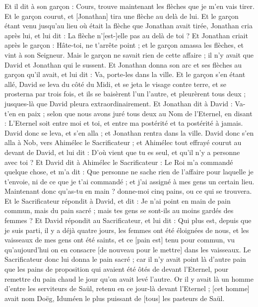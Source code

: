 \begin{multicols}{2}
Et il dit à son garçon : Cours, trouve maintenant les flèches que je m'en vais tirer. Et le garçon courut, et [Jonathan] tira une flèche au delà de lui.
Et le garçon étant venu jusqu'au lieu où était la flèche que Jonathan avait tirée, Jonathan cria après lui, et lui dit : La flèche n'[est-]elle pas au delà de toi ?
Et Jonathan criait après le garçon : Hâte-toi, ne t'arrête point ; et le garçon amassa les flèches, et vint à son Seigneur.
Mais le garçon ne savait rien de cette affaire ; il n'y avait que David et Jonathan qui le sussent.
Et Jonathan donna son arc et ses flèches au garçon qu'il avait, et lui dit : Va, porte-les dans la ville.
Et le garçon s'en étant allé, David se leva du côté du Midi, et se jeta le visage contre terre, et se prosterna par trois fois, et ils se baisèrent l'un l'autre, et pleurèrent tous deux ; jusques-là que David pleura extraordinairement.
Et Jonathan dit à David : Va-t'en en paix ; selon que nous avons juré tous deux au Nom de l'Eternel, en disant : L'Eternel soit entre moi et toi, et entre ma postérité et ta postérité à jamais.
David donc se leva, et s'en alla ; et Jonathan rentra dans la ville.
\VerseOne{}David donc s'en alla à Nob, vers Ahimélec le Sacrificateur ; et Ahimélec tout effrayé courut au devant de David, et lui dit : D'où vient que tu es seul, et qu'il n'y a personne avec toi ?
Et David dit à Ahimélec le Sacrificateur : Le Roi m'a commandé quelque chose, et m'a dit : Que personne ne sache rien de l'affaire pour laquelle je t'envoie, ni de ce que je t'ai commandé ; et j'ai assigné à mes gens un certain lieu.
Maintenant donc qu'as-tu en main ? donne-moi cinq pains, ou ce qui se trouvera.
Et le Sacrificateur répondit à David, et dit : Je n'ai point en main de pain commun, mais du pain sacré ; mais tes gens se sont-ils au moins gardés des femmes ?
Et David répondit au Sacrificateur, et lui dit : Qui plus est, depuis que je suis parti, il y a déjà quatre jours, les femmes ont été éloignées de nous, et les vaisseaux de mes gens ont été saints, et ce [pain est] tenu pour commun, vu qu'aujourd'hui on en consacre [de nouveau pour le mettre] dans les vaisseaux.
Le Sacrificateur donc lui donna le pain sacré ; car il n'y avait point là d'autre pain que les pains de proposition qui avaient été ôtés de devant l'Eternel, pour remettre du pain chaud le jour qu'on avait levé l'autre.
Or il y avait là un homme d'entre les serviteurs de Saül, retenu en ce jour-là devant l'Eternel ; [cet homme] avait nom Doëg, Iduméen le plus puissant de [tous] les pasteurs de Saül.

\end{multicols}
